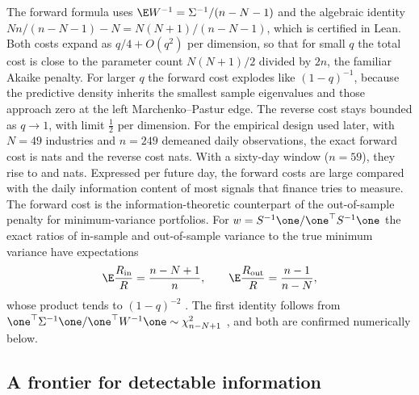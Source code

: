 The forward formula uses $\E W^{-1}=\Sigma^{-1}/(n-N-1)$ \citep[Ch.~3]{muirhead1982aspects} and the algebraic identity $Nn/(n-N-1)-N=N(N+1)/(n-N-1)$, which is certified in Lean. Both costs expand as $q/4+O(q^2)$ per dimension, so that for small $q$ the total cost is close to the parameter count $N(N+1)/2$ divided by $2n$, the familiar Akaike penalty. For larger $q$ the forward cost explodes like $(1-q)^{-1}$, because the predictive density inherits the smallest sample eigenvalues and those approach zero at the left Marchenko--Pastur edge. The reverse cost stays bounded as $q\to1$, with limit $\tfrac12$ per dimension. For the empirical design used later, with $N=49$ industries and $n=249$ demeaned daily observations, the exact forward cost is \KLfwdN{} nats and the reverse cost \KLrevN{} nats. With a sixty-day window ($n=59$), they rise to \KLfwdSixty{} and \KLrevSixty{} nats. Expressed per future day, the forward costs are large compared with the daily information content of most signals that finance tries to measure. The forward cost is the information-theoretic counterpart of the out-of-sample penalty for minimum-variance portfolios. For $w=S^{-1}\one/\one^\top S^{-1}\one$ the exact ratios of in-sample and out-of-sample variance to the true minimum variance have expectations
\begin{equation}
 \E\frac{R_{\rm in}}{R}=\frac{n-N+1}n,\qquad
 \E\frac{R_{\rm out}}{R}=\frac{n-1}{n-N},
 \label{eq:gmv}
\end{equation}
whose product tends to $(1-q)^{-2}$ \citep{kan2007optimal,elkaroui2010high,bodnar2018estimation}. The first identity follows from $\one^\top\Sigma^{-1}\one/\one^\top W^{-1}\one\sim\chi^2_{n-N+1}$ \citep[Ch.~3]{muirhead1982aspects}, and both are confirmed numerically below.

\subsection*{A frontier for detectable information}

